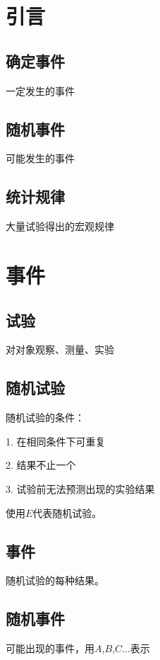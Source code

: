\def\lecturer{SongHao}
\def\noter{THF}
\def\className{Probability Theory and Mathematical Statistics}
\def\term{III-A}



\maketitle
\tableofcontents
\section{引言}%
\label{sec:引言}
\subsection{确定事件}%
\label{sub:确定事件}
一定发生的事件
\subsection{随机事件}
可能发生的事件
\subsection{统计规律}%
\label{sub:统计规律}
大量试验得出的宏观规律
\section{事件}%
\label{sec:事件}
\subsection{试验}%
\label{sub:试验}
对对象观察、测量、实验
\subsection{随机试验}%
\label{sub:随机试验}
随机试验的条件：

1. 在相同条件下可重复

2. 结果不止一个

3. 试验前无法预测出现的实验结果

使用$E$代表随机试验。
\subsection{事件}%
\label{sub:事件}
随机试验的每种结果。
\subsection{随机事件}%
\label{sub:随机事件}
可能出现的事件，用$A$,$B$,$C\dots$表示
